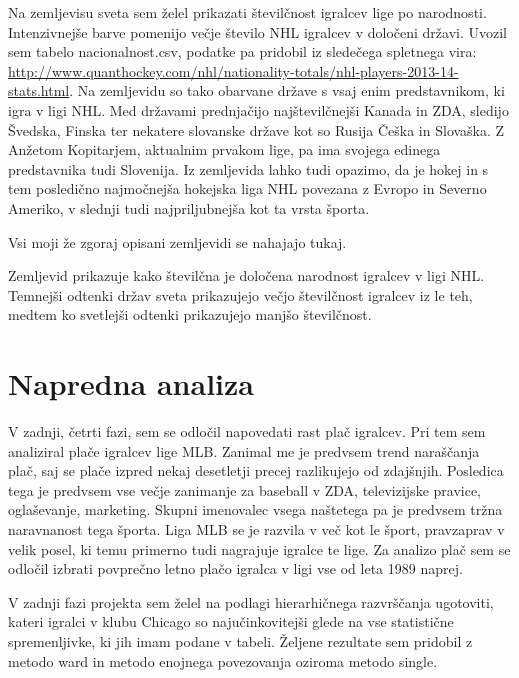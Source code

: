 \documentclass[11pt,a4paper]{article}
\begin{document}
Na zemljevisu sveta sem želel prikazati številčnost igralcev lige po narodnosti. Intenzivnejše barve pomenijo večje število NHL igralcev v določeni državi. Uvozil sem tabelo nacionalnost.csv, podatke pa pridobil iz sledečega spletnega vira: \url{http://www.quanthockey.com/nhl/nationality-totals/nhl-players-2013-14-stats.html}. Na zemljevidu so tako obarvane države s vsaj enim predstavnikom, ki igra v ligi NHL. Med državami prednjačijo najštevilčnejši Kanada in ZDA, sledijo Švedska, Finska ter nekatere slovanske države kot so Rusija Češka in Slovaška. Z Anžetom Kopitarjem, aktualnim prvakom lige, pa ima svojega edinega predstavnika tudi Slovenija. Iz zemljevida lahko tudi opazimo, da je hokej in s tem posledično najmočnejša hokejska liga NHL povezana z Evropo in Severno Ameriko, v slednji tudi najpriljubnejša kot ta vrsta športa.
\newpage

Vsi moji že zgoraj opisani zemljevidi se nahajajo tukaj.




Zemljevid prikazuje kako številčna je določena narodnost igralcev v ligi NHL.
Temnejši odtenki držav sveta prikazujejo večjo številčnost igralcev iz le teh, medtem ko svetlejši odtenki prikazujejo manjšo številčnost. 



\pagebreak
\section{Napredna analiza}

V zadnji, četrti fazi, sem se odločil napovedati rast plač igralcev. Pri tem sem analiziral plače igralcev lige MLB. Zanimal me je predvsem trend naraščanja plač, saj se plače izpred nekaj desetletji precej razlikujejo od zdajšnjih. Posledica tega je predvsem vse večje zanimanje za baseball v ZDA, televizijske pravice, oglaševanje, marketing. Skupni imenovalec vsega naštetega pa je predvsem tržna naravnanost tega športa. Liga MLB se je razvila v več kot le šport, pravzaprav v velik posel, ki temu primerno tudi nagrajuje igralce te lige. Za analizo plač sem se odločil izbrati povprečno letno plačo igralca v ligi vse od leta 1989 naprej.

V zadnji fazi projekta sem želel na podlagi hierarhičnega razvrščanja ugotoviti, kateri igralci v klubu Chicago so najučinkovitejši glede na vse statistične spremenljivke, ki jih imam podane v tabeli. Željene rezultate sem pridobil z metodo ward in metodo enojnega povezovanja oziroma metodo single.
\end{document}
